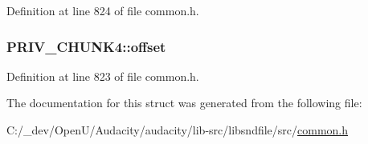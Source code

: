 Definition at line 824 of file common.\+h.

\subsubsection[{\texorpdfstring{offset}{offset}}]{ P\+R\+I\+V\+\_\+\+C\+H\+U\+N\+K4\+::offset}\hypertarget{struct_p_r_i_v___c_h_u_n_k4_a0851f44c08130d1146cba65064e2b4e6}{}\label{struct_p_r_i_v___c_h_u_n_k4_a0851f44c08130d1146cba65064e2b4e6}


Definition at line 823 of file common.\+h.



The documentation for this struct was generated from the following file\+:\begin{DoxyCompactItemize}
\item 
C\+:/\+\_\+dev/\+Open\+U/\+Audacity/audacity/lib-\/src/libsndfile/src/\hyperlink{libsndfile_2src_2common_8h}{common.\+h}\end{DoxyCompactItemize}
